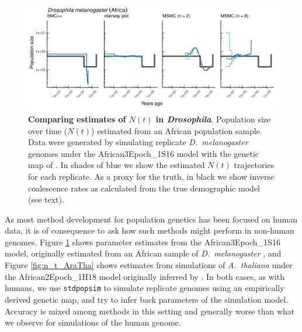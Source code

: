 \documentclass[12pt,halfline,a4paper]{ouparticle}
\newcommand{\stdpopsim}{\texttt{stdpopsim}\xspace}
\begin{document}
\begin{figure}
\begin{center}
\includegraphics[width=0.8\linewidth]{display_items/d_mel_Sheehan_mask2.png}
\caption{\textbf{Comparing estimates of $N(t)$ in \textit{Drosophila}}. Population
size over time ($N(t)$) estimated from an African population sample. Data were generated by simulating
replicate \textit{D.~melanogaster} genomes under the African3Epoch\_1S16 model
with the genetic map of \cite{comeron2012many}. In shades of blue we show the estimated
$N(t)$ trajectories for each replicate. 
As a proxy for the truth, in black we show inverse coalescence rates
as calculated from the true demographic model (see text).
}
\label{fig:n_t_sheehan}
\end{center}
\end{figure}

As most method development for population genetics has been focused on human
data, it is of consequence to ask how such methods might perform in non-human
genomes. Figure \ref{fig:n_t_sheehan} shows parameter estimates from the African3Epoch\_1S16
model, originally estimated from an African sample of \textit{D.~melanogaster} \citep{sheehan2016deep},
and Figure \ref{fig:n_t_AraTha} shows estimates from simulations of \textit{A.~thaliana}
under the African2Epoch\_1H18 model originally inferred by \cite{huber2018gene}.
In both cases, as with humans, we use \stdpopsim to simulate replicate genomes using an empirically derived genetic map,
and try to infer back parameters of the simulation model.
Accuracy is mixed among methods in this setting and generally worse than what we
observe for simulations of the human genome.
\end{document}
